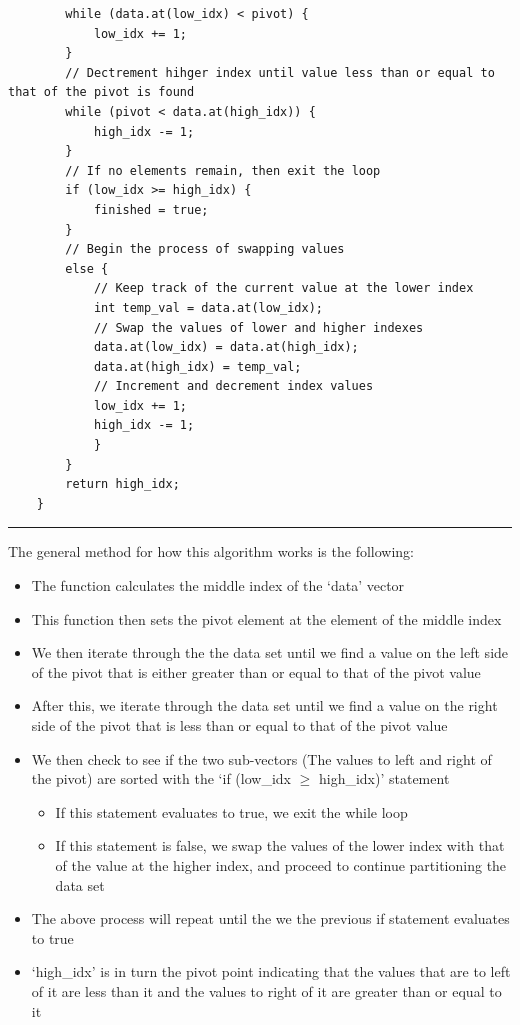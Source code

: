 \documentclass[a4paper,9pt]{article}
\newcommand{\horizontalline}{\noindent \rule{\textwidth}{0.5pt}\par}
\begin{document}
\begin{highlight}
\begin{verbatim}
        while (data.at(low_idx) < pivot) {
            low_idx += 1;
        }
        // Dectrement hihger index until value less than or equal to that of the pivot is found
        while (pivot < data.at(high_idx)) {
            high_idx -= 1;
        }
        // If no elements remain, then exit the loop
        if (low_idx >= high_idx) {
            finished = true;
        }
        // Begin the process of swapping values
        else {
            // Keep track of the current value at the lower index
            int temp_val = data.at(low_idx);
            // Swap the values of lower and higher indexes
            data.at(low_idx) = data.at(high_idx);
            data.at(high_idx) = temp_val;
            // Increment and decrement index values
            low_idx += 1;
            high_idx -= 1;
            }
        }
        return high_idx;
    }
    \end{verbatim}

    \horizontalline

    The general method for how this algorithm works is the following:

    \begin{itemize}
        \item The function calculates the middle index of the `data' vector
        \item This function then sets the pivot element at the element of the middle index
        \item We then iterate through the the data set until we find a value on the left side of the pivot that is either greater than or equal to that of the pivot value
        \item After this, we iterate through the data set until we find a value on the right side of the pivot that is less than or equal to that of the pivot value
        \item We then check to see if the two sub-vectors (The values to left and right of the pivot) are sorted with the `if (low\_idx $\geq$ high\_idx)' statement
        \begin{itemize}
            \item If this statement evaluates to true, we exit the while loop
            \item If this statement is false, we swap the values of the lower index with that of the value at the higher index, and proceed to continue partitioning the data set
        \end{itemize}
        \item The above process will repeat until the we the previous if statement evaluates to true
        \item `high\_idx' is in turn the pivot point indicating that the values that are to left of it are less than it and the values to right of it are greater than or equal to it
    \end{itemize}


\end{highlight}
\end{document}
